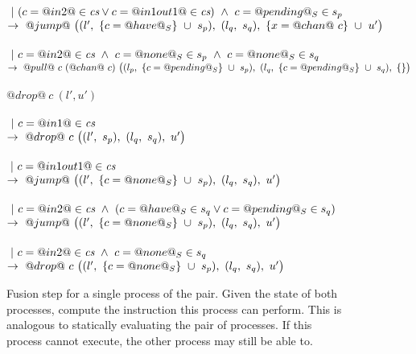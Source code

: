\begin{figure}
\begin{tabbing}
\> \>  \\
\> \> $~|~(c=@in2@\in\textit{cs} \vee c=@in1out1@\in\textit{cs}) ~\wedge~ c=@pending@_S \in s_p$ \\
\> \> $\to~@jump@~
      \big((l',~\{ c=@have@_S \}~\cup~s_p),~(l_q,~s_q),~\{ x=@chan@~c \}~\cup~u' \big)
        $ \\

\> \> \\
\> \> $~|~c=@in2@\in\textit{cs} ~\wedge~ c=@none@_S \in s_p ~\wedge~ c=@none@_S \in s_q$ \\
\> \> $\to~@pull@~c~(@chan@~c)~
      \big((l_p,~\{ c=@pending@_S \}~\cup~s_p),~(l_q,~\{ c=@pending@_S \}~\cup~s_q),~\{  \} \big)
  $ \\
\\

\> $@drop@~c~(l',u')$ \\
\> \>  \\
\> \> $~|~c=@in1@\in\textit{cs}$ \\
\> \> $\to~@drop@~c~
      \big((l',~s_p),~(l_q,~s_q),~u' \big)
      $ \\

\> \> \\
\> \> $~|~c=@in1out1@\in\textit{cs}$ \\
\> \> $\to~@jump@~
      \big((l',~\{ c=@none@_S \}~\cup~s_p),~(l_q,~s_q),~u' \big)
      $ \\

\> \> \\
\> \> $~|~c=@in2@\in\textit{cs} ~\wedge~ (c=@have@_S \in s_q \vee c=@pending@_S \in s_q)$ \\
\> \> $\to~@jump@~
      \big((l',~\{ c=@none@_S \}~\cup~s_p),~(l_q,~s_q),~u' \big)
      $ \\


\> \> \\
\> \> $~|~c=@in2@\in\textit{cs} ~\wedge~ c=@none@_S \in s_q$ \\
\> \> $\to~@drop@~c~
      \big((l',~\{ c=@none@_S \}~\cup~s_p),~(l_q,~s_q),~u' \big)
      $
\end{tabbing}

\caption{Fusion step for a single process of the pair.
Given the state of both processes, compute the instruction this process can perform.
This is analogous to statically evaluating the pair of processes.
If this process cannot execute, the other process may still be able to.
}
\label{fig:Fusion:Def:Step}
\end{figure}

